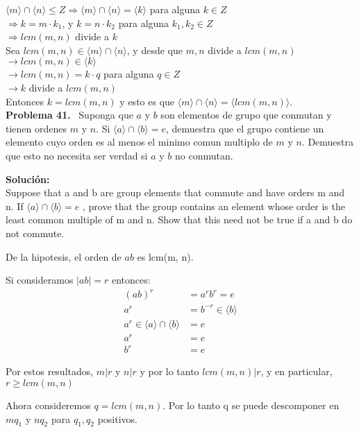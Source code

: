 \documentclass{article}
\newcounter{problem}
\newcounter{solution}
\newcommand\Problem[1]{%
  \stepcounter{problem}%
  \textbf{Problema #1.}~%
  \setcounter{solution}{0}%
}
\newcommand\TheSolution{%
  \textbf{Solución:}\\%
}
\begin{document}
	$\langle m \rangle \cap \langle n \rangle \leq Z \Rightarrow \langle m \rangle \cap \langle n \rangle = \langle k \rangle$ para alguna $k \in Z$\\
	$\Rightarrow k = m \cdot k_1$, y $k = n \cdot k_2$ para alguna $k_1,k_2 \in Z$\\
	$\Rightarrow lcm(m,n)$ divide a $k$\\
	Sea $lcm(m,n) \in \langle m \rangle \cap \langle n \rangle$, y desde que $m,n$ divide a $lcm(m,n)$\\
	$\rightarrow lcm(m,n) \in \langle k \rangle$\\
	$\rightarrow lcm(m,n) = k \cdot q$ para alguna $q \in Z$\\
	$\rightarrow k$ divide a $ lcm(m,n)$\\
	Entonces $k = lcm(m,n)$ y esto es que $\langle m \rangle \cap \langle n \rangle = \langle lcm(m,n) \rangle$.\\

\Problem{41} Suponga que $a$ y $b$ son elementos de grupo que conmutan y
tienen ordenes $m$ y $n$. Si $\langle a \rangle \cap \langle b \rangle = {e}$,
demuestra que el grupo contiene un elemento cuyo orden es al menos el minimo
comun multiplo de $m$ y $n$. Demuestra que esto no necesita ser verdad si $a$
y $b$ no conmutan.

\TheSolution{}
Suppose that a and b are group elements that commute and have
orders m and n. If $\langle a \rangle \cap \langle b \rangle = {e}$ ,
prove that the group contains an element whose order is the least common multiple of m and n.
Show that this need not be true if a and b do not commute.

De la hipotesis, el orden de $ab$ es lcm(m, n).

Si consideramos $|ab| = r$ entonces:
\[
\begin{align}
  {(ab)}^{r} &= a^{r} b^{r} = e \\
  a^{r}      &= b^{-r} \in \langle b \rangle \\
  a^{r} \in \langle a \rangle \cap \langle b \rangle &= {e} \\
  a^{r} &= e \\
  b^{r} &= e
\end{align}
\]

Por estos resultados, $m | r$ y $n | r$ y por lo tanto $lcm(m, n) | r$,
y en particular, $r \geq lcm(m, n)$

Ahora consideremos $q = lcm(m, n)$. Por lo tanto q se puede descomponer en 
$m q_{1}$ y $n q_{2}$ para $q_{1}, q_{2}$ positivos.
\end{document}
